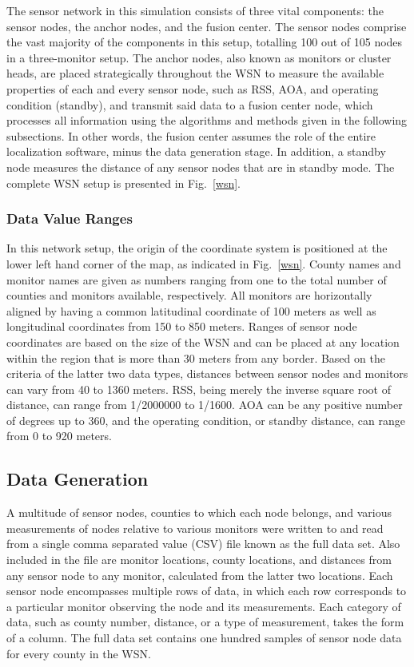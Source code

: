 \documentclass[12pt]{uthesis-v12}  %
\begin{document}
The sensor network in this simulation consists of three vital components: the sensor nodes, the anchor nodes, and the fusion center. The sensor nodes comprise the vast majority of the components in this setup, totalling 100 out of 105 nodes in a three-monitor setup. The anchor nodes, also known as monitors or cluster heads, are placed strategically throughout the WSN to measure the available properties of each and every sensor node, such as RSS, AOA, and operating condition (standby), and transmit said data to a fusion center node, which processes all information using the algorithms and methods given in the following subsections. In other words, the fusion center assumes the role of the entire localization software, minus the data generation stage. In addition, a standby node measures the distance of any sensor nodes that are in standby mode. The complete WSN setup is presented in Fig.~\ref{wsn}.

\subsubsection{Data Value Ranges}

In this network setup, the origin of the coordinate system is positioned at the lower left hand corner of the map, as indicated in Fig.~\ref{wsn}. County names and monitor names are given as numbers ranging from one to the total number of counties and monitors available, respectively. All monitors are horizontally aligned by having a common latitudinal coordinate of 100 meters as well as longitudinal coordinates from 150 to 850 meters. Ranges of sensor node coordinates are based on the size of the WSN and can be placed at any location within the region that is more than 30 meters from any border. Based on the criteria of the latter two data types, distances between sensor nodes and monitors can vary from 40 to 1360 meters. RSS, being merely the inverse square root of distance, can range from 1/2000000 to 1/1600.  AOA can be any positive number of degrees up to 360, and the operating condition, or standby distance, can range from 0 to 920 meters.

\subsection{Data Generation}

A multitude of sensor nodes, counties to which each node belongs, and various measurements of nodes relative to various monitors were written to and read from a single comma separated value (CSV) file known as the full data set. Also included in the file are  monitor locations, county locations, and distances from any sensor node to any monitor, calculated from the latter two locations. Each sensor node encompasses multiple rows of data, in which each row corresponds to a particular monitor observing the node and its measurements. Each category of data, such as county number, distance, or a type of measurement, takes the form of a column. The full data set contains one hundred samples of sensor node data for every county in the WSN.
\end{document}
